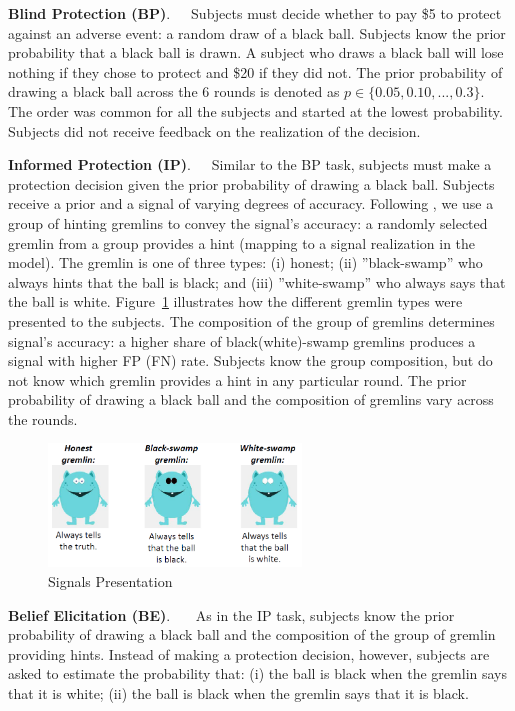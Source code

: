 \documentclass[12pt,a4paper]{article}
\begin{document}
\bigskip
\noindent\textbf{Blind Protection (BP)}.\ \ \ Subjects must decide whether to pay \$5 to protect against an adverse event: a random draw of a black ball.  Subjects know the prior probability that a black ball is drawn. A subject who draws a black ball will lose nothing if they chose to protect and \$20 if they did not. The prior probability of drawing a black ball across the 6 rounds is denoted as $p \in \{0.05,0.10,...,0.3\}$. The order was common for all the subjects and started at the lowest probability. Subjects did not receive feedback on the realization of the decision.

\bigskip
\noindent\textbf{Informed Protection (IP)}.\ \ \ Similar to the BP task, subjects must make a protection decision given the prior probability of drawing a black ball. Subjects receive a prior and a signal of varying degrees of accuracy. Following \citet{coutts_good_2019}, we use a group of hinting gremlins to convey the signal's accuracy: a randomly selected gremlin from a group provides a hint (mapping to a signal realization in the model). The gremlin is one of three types: (i) honest; (ii) ''black-swamp'' who always hints that the ball is black; and (iii) ''white-swamp'' who always says that the ball is white. Figure~\ref{fig:Gremlins} illustrates how the different gremlin types were presented to the subjects. The composition of the group of gremlins determines signal's accuracy: a higher share of black(white)-swamp gremlins produces a signal with higher FP (FN) rate. Subjects know the group composition, but do not know which gremlin provides a hint in any particular round. The prior probability of drawing a black ball and the composition of gremlins vary across the rounds.  

\begin{figure}[H]
\centering
\caption{Signals Presentation} \label{fig:Gremlins}
\includegraphics[width=0.6\textwidth]{Graphs/gremlins1.png}
\end{figure}


\bigskip
\noindent\textbf{Belief Elicitation (BE)}.\ \ \ 
As in the IP task, subjects know the prior probability of drawing a black ball and the composition of the group of gremlin providing hints. Instead of making a protection decision, however, subjects are asked to estimate the probability that: (i) the ball is black when the gremlin says that it is white; (ii) the ball is black when the gremlin says that it is black. 
\end{document}
